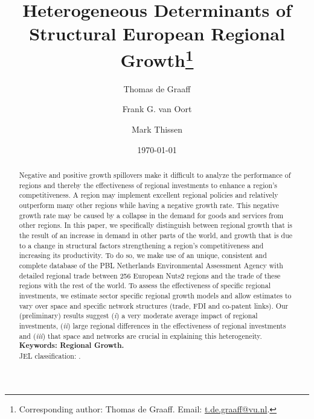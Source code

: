 \documentclass[10pt,parskip,abstracton,notitlepage]{scrartcl}
\begin{document}
	
	\title{Heterogeneous Determinants of Structural European Regional Growth\thanks{Corresponding author: Thomas de Graaff. Email: \url{t.de.graaff@vu.nl}. 
		}}
		\author[1]{\large Thomas de Graaff}
		\author[2]{\large Frank G. van Oort}
		\author[3]{\large Mark Thissen}
		
		\date{\normalsize\today}
		\maketitle
		
		\begin{abstract}
			\noindent
			\newline
			Negative and positive growth spillovers make it difficult to analyze the performance of regions and thereby the effectiveness of regional investments to enhance a region's competitiveness. A region may implement excellent regional policies and relatively outperform many other regions while having a negative growth rate. This negative growth rate may be caused by a collapse in the demand for goods and services from other regions. In this paper, we specifically distinguish between regional growth that is the result of an increase in demand in other parts of the world, and growth that is due to a change in structural factors strengthening a region's competitiveness and increasing its productivity. To do so, we make use of an unique, consistent and complete database of the PBL Netherlands Environmental Assessment Agency with detailed regional trade between 256 European Nuts2 regions and the trade of these regions with the rest of the world. To assess the effectiveness of specific regional investments, we estimate sector specific regional growth models and allow estimates to vary over space and specific network structures (trade, FDI and co-patent links). Our (preliminary) results suggest (\textit{i}) a very moderate average impact of regional investments, (\textit{ii}) large regional differences in the effectiveness of regional investments and (\textit{iii}) that space and networks are crucial in explaining this heterogeneity.\\
			\newline
			{\small \textbf{Keywords: Regional Growth.}}\\
			{\small JEL classification: .}
		\end{abstract}

\section{}
\end{document}
